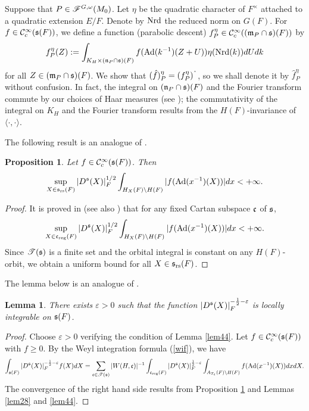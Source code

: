 \documentclass[a4paper]{amsart}
\newcommand{\fm}{{\mathfrak{m}}} \newcommand{\fn}{{\mathfrak{n}}}\newcommand{\fo}{{\mathfrak{o}}} \newcommand{\fp}{{\mathfrak{p}}}
\newtheorem{lem}[thm]{Lemma}
\newtheorem{prop}[thm]{Proposition}
\theoremstyle{definition}
\theoremstyle{remark}
\numberwithin{equation}{subsection}
\begin{document}
Suppose that $P\in\mathscr{F}^{G,\omega}(M_0)$. Let $\eta$ be the quadratic character of $F^\times$ attached to a quadratic extension $E/F$. Denote by ${\mathrm{Nrd}}$ the reduced norm on $G(F)$. For $f\in{\mathcal {C}}_c^\infty({\mathfrak{s}}(F))$, we define a function (parabolic descent) $f_P^\eta\in\CC_c^\infty((\fm_P\cap\fs)(F))$ by
\begin{equation}\label{pardes1}
 f_P^\eta(Z):=\int_{K_H\times(\fn_P\cap\fs)(F)} f(\Ad(k^{-1})(Z+U)) \eta(\Nrd(k)) dUdk 
\end{equation}
for all $Z\in(\fm_P\cap\fs)(F)$. We show that $(\hat{f})_P^\eta=(f_P^\eta)^\string^$, so we shall denote it by $\hat{f}_P^\eta$ without confusion. In fact, the integral on $(\fn_P\cap\fs)(F)$ and the Fourier transform commute by our choices of Haar measures (see \cite[\S I.7]{MR1344131}); the commutativity of the integral on $K_H$ and the Fourier transform results from the $H(F)$-invariance of $\langle\cdot,\cdot\rangle$. 

The following result is an analogue of \cite[Theorem 13]{MR0414797}. 

\begin{prop}\label{bdoi1}
Let $f\in{\mathcal {C}}_c^\infty({\mathfrak{s}}(F))$. Then
$$ \sup_{X\in{\mathfrak{s}}_{\mathrm{rs}}(F)}|D^{\mathfrak{s}}(X)|_F^{1/2} \int_{H_X(F)\backslash H(F)} |f({\mathrm{Ad}}(x^{-1})(X))| dx<+\infty. $$
\end{prop}

\begin{proof}
It is proved in \cite[Theorem 6.11]{MR3414387} (see also \cite[p. 77]{MR3299843}) that for any fixed Cartan subspace ${\mathfrak{c}}$ of ${\mathfrak{s}}$, 
$$ \sup_{X\in{\mathfrak{c}}_{\mathrm{reg}}(F)}|D^{\mathfrak{s}}(X)|_F^{1/2} \int_{H_X(F)\backslash H(F)} |f({\mathrm{Ad}}(x^{-1})(X))| dx<+\infty. $$
Since $\mathscr{T}({\mathfrak{s}})$ is a finite set and the orbital integral is constant on any $H(F)$-orbit, we obtain a uniform bound for all $X\in{\mathfrak{s}}_{\mathrm{rs}}(F)$. 
\end{proof}

The lemma below is an analogue of \cite[Theorem 15]{MR0414797}. 

\begin{lem}\label{thm15}
There exists $\varepsilon>0$ such that the function $|D^{\mathfrak{s}}(X)|_F^{-\frac{1}{2}-\varepsilon}$ is locally integrable on ${\mathfrak{s}}(F)$. 
\end{lem}

\begin{proof}
Choose $\varepsilon>0$ verifying the condition of Lemma \ref{lem44}. Let $f\in{\mathcal {C}}_c^\infty({\mathfrak{s}}(F))$ with $f\geq0$. By the Weyl integration formula (\ref{wif}), we have
$$ \int_{{\mathfrak{s}}(F)} |D^{\mathfrak{s}}(X)|_F^{-\frac{1}{2}-\varepsilon}f(X) dX=\sum_{{\mathfrak{c}}\in\mathscr{T}({\mathfrak{s}})} |W(H, {\mathfrak{c}})|^{-1} \int_{{\mathfrak{c}}_{\mathrm{reg}}(F)} |D^{\mathfrak{s}}(X)|_F^{\frac{1}{2}-\varepsilon} \int_{A_{T_{\mathfrak{c}}}(F)\backslash H(F)} f({\mathrm{Ad}}(x^{-1})(X)) dx dX. $$
The convergence of the right hand side results from Proposition \ref{bdoi1} and Lemmas \ref{lem28} and \ref{lem44}. 
\end{proof}
\end{document}
